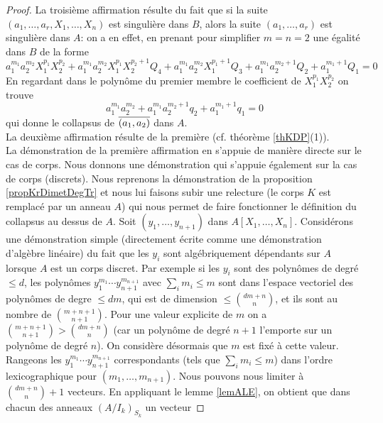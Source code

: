 \begin{proof}
La troisième affirmation résulte du fait que si la suite 
 $(a_1,\ldots ,a_r,X_1,\ldots,X_n)$ est singulière dans $B$, 
alors la suite $(a_1,\ldots ,a_r)$ est singulière dans $A$: on a 
en effet, en prenant pour simplifier $m=n=2$ une égalité dans $B$ de
la forme
$$ a_1^{m_1}a_2^{m_2}X_1^{p_1}X_2^{p_2}+ 
a_1^{m_1}a_2^{m_2}X_1^{p_1}X_2^{p_2+1}Q_4+
a_1^{m_1}a_2^{m_2}X_1^{p_1+1}Q_3+
a_1^{m_1}a_2^{m_2+1}Q_2+
a_1^{m_1+1}Q_1 = 0
$$
En regardant dans le polynôme du premier membre le coefficient de 
$X_1^{p_1}X_2^{p_2}$ on trouve
$$ a_1^{m_1}a_2^{m_2}+ 
a_1^{m_1}a_2^{m_2+1}q_2+
a_1^{m_1+1}q_1 = 0
$$
qui donne le collapsus de $\overline{(a_1,a_2)}$ dans $A$.\\
La deuxième affirmation résulte de la première (cf. théorème 
\ref{thKDP}(1)).\\
La démonstration de la première affirmation en \clama s'appuie de manière 
directe sur le cas de corps. Nous donnons une démonstration \cov qui s'appuie 
également sur la cas de corps (discrets). 
Nous reprenons la démonstration de la proposition \ref{propKrDimetDegTr} et nous 
lui faisons subir une relecture
(le corps $K$ est remplacé par un anneau $A$) qui nous permet de faire 
fonctionner le définition du collapsus au dessus de $A$. 
Soit $(y_1,\ldots,y_{n+1})$ dans $A[X_1,\ldots, X_n]$. 
Considérons une démonstration simple (\cad directement écrite comme une 
démonstration d'algèbre linéaire) du fait que les
$y_i$ sont algébriquement dépendants sur $A$ 
lorsque $A$ est un corps discret.
Par exemple si les $y_i$ sont des polynômes de degré $\le d$, les 
polynômes
$y_1^{m_1}\cdots y_{n+1}^{m_{n+1}}$ avec  $\sum_i m_i\le m$ sont dans 
l'espace vectoriel des polynômes de degre $\le dm$, qui est de dimension 
$\le {dm+n\choose n}$, et ils sont au nombre de ${m+n+1 \choose n+1}$.
Pour une valeur explicite de $m$ on a 
${m+n+1 \choose n+1}>{dm+n\choose n}$ (car un polynôme de degré $n+1$ 
l'emporte sur un polynôme de degré $n$).
On considère désormais que $m$ est fixé à cette valeur.
Rangeons les  $y_1^{m_1}\cdots y_{n+1}^{m_{n+1}}$ 
correspondants
(\cad tels que   $\sum_i m_i\le m$) dans l'ordre lexicographique pour 
$(m_1,\ldots,m_{n+1})$. Nous pouvons nous limiter à ${dm+n\choose n}+1$
vecteurs.
En appliquant le lemme \ref{lemALE}, on obtient que dans chacun des 
anneaux
$(A/I_k)_{S_k}$ un vecteur 

\end{proof}
